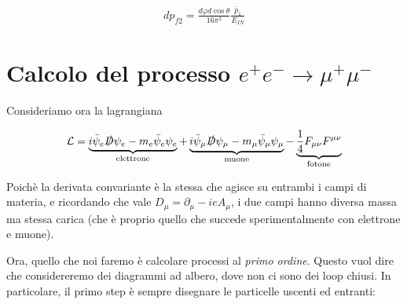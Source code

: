 \documentclass[11pt]{report}
\begin{document}
\begin{align}
    dp_{f2} = \frac{d\varphi d\cos\theta}{16\pi^2}\frac{\bar{p}_1}{E_{IN}}
\end{align}

\section{Calcolo del processo \(e^+e^- \rightarrow \mu^+\mu^-\)}

Consideriamo ora la lagrangiana 

\begin{align}
    \mathcal{L} = \underbrace{i\bar{\psi}_e \slashed{D}\psi_e -m_e\bar{\psi}_e\psi_e}_{\text{elettrone}} + \underbrace{i\bar{\psi}_\mu \slashed{D}\psi_\mu -m_\mu\bar{\psi}_\mu\psi_\mu}_{\text{muone}} - \underbrace{\frac{1}{4}F_{\mu\nu}F^{\mu\nu}}_{\text{fotone}} 
\end{align}

Poichè la derivata convariante è la stessa che agisce su entrambi i campi di materia, e ricordando che vale \(D_\mu = \partial_\mu -ieA_\mu\), i due campi hanno diversa massa ma stessa carica (che è proprio quello che succede sperimentalmente con elettrone e muone). 


Ora, quello che noi faremo è calcolare processi al \emph{primo ordine}. Questo vuol dire che considereremo dei diagrammi ad albero, dove non ci sono dei loop chiusi. In particolare, il primo step è sempre disegnare le particelle uscenti ed entranti: 
\end{document}
